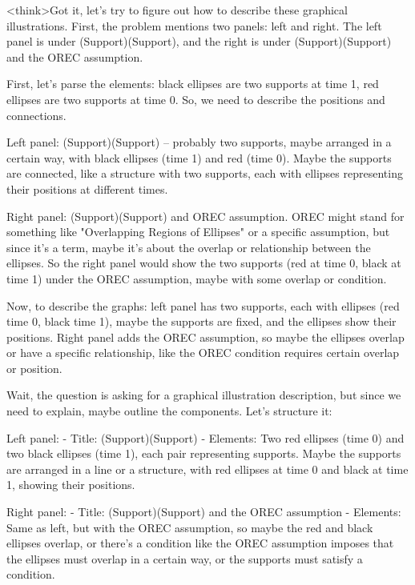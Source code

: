 <think>Got it, let's try to figure out how to describe these graphical illustrations. First, the problem mentions two panels: left and right. The left panel is under (Support)(Support), and the right is under (Support)(Support) and the OREC assumption. 

First, let's parse the elements: black ellipses are two supports at time 1, red ellipses are two supports at time 0. So, we need to describe the positions and connections. 

Left panel: (Support)(Support) – probably two supports, maybe arranged in a certain way, with black ellipses (time 1) and red (time 0). Maybe the supports are connected, like a structure with two supports, each with ellipses representing their positions at different times. 

Right panel: (Support)(Support) and OREC assumption. OREC might stand for something like "Overlapping Regions of Ellipses" or a specific assumption, but since it's a term, maybe it's about the overlap or relationship between the ellipses. So the right panel would show the two supports (red at time 0, black at time 1) under the OREC assumption, maybe with some overlap or condition. 

Now, to describe the graphs: left panel has two supports, each with ellipses (red time 0, black time 1), maybe the supports are fixed, and the ellipses show their positions. Right panel adds the OREC assumption, so maybe the ellipses overlap or have a specific relationship, like the OREC condition requires certain overlap or position. 

Wait, the question is asking for a graphical illustration description, but since we need to explain, maybe outline the components. Let's structure it:

Left panel: 
- Title: (Support)(Support) 
- Elements: Two red ellipses (time 0) and two black ellipses (time 1), each pair representing supports. Maybe the supports are arranged in a line or a structure, with red ellipses at time 0 and black at time 1, showing their positions. 

Right panel: 
- Title: (Support)(Support) and the OREC assumption 
- Elements: Same as left, but with the OREC assumption, so maybe the red and black ellipses overlap, or there's a condition like the OREC assumption imposes that the ellipses must overlap in a certain way, or the supports must satisfy a condition. 

